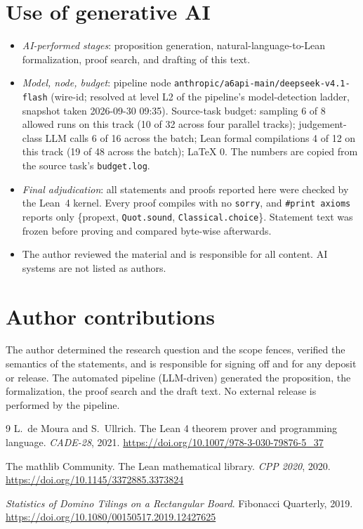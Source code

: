 \documentclass[11pt]{article}
\begin{document}
\section*{Use of generative AI}
\begin{itemize}
\item \emph{AI-performed stages}: proposition generation, natural-language-to-Lean
formalization, proof search, and drafting of this text.
\item \emph{Model, node, budget}: pipeline node
\texttt{anthropic/}\allowbreak\texttt{a6api-main/}\allowbreak\texttt{deepseek-v4.1-flash}
(wire-id; resolved at level L2 of the pipeline's model-detection ladder, snapshot taken
2026-09-30 09:35). Source-task budget: sampling 6 of 8 allowed runs on this track (10 of 32
across four parallel tracks); judgement-class LLM calls 6 of 16 across the batch; Lean
formal compilations 4 of 12 on this track (19 of 48 across the batch); LaTeX 0. The numbers
are copied from the source task's \texttt{budget.log}.
\item \emph{Final adjudication}: all statements and proofs reported here were checked by the
Lean~4 kernel. Every proof compiles with no \texttt{sorry}, and \texttt{\#print axioms}
reports only \{propext, \texttt{Quot.sound}, \texttt{Classical.choice}\}. Statement text was
frozen before proving and compared byte-wise afterwards.
\item The author reviewed the material and is responsible for all content. AI systems are
not listed as authors.
\end{itemize}

\section*{Author contributions}
The author determined the research question and the scope fences, verified the semantics of
the statements, and is responsible for signing off and for any deposit or release. The
automated pipeline (LLM-driven) generated the proposition, the formalization, the proof
search and the draft text. No external release is performed by the pipeline.

\begin{thebibliography}{9}
L.~de Moura and S.~Ullrich.
\newblock The Lean 4 theorem prover and programming language.
\newblock \emph{CADE-28}, 2021. \url{https://doi.org/10.1007/978-3-030-79876-5_37}

The mathlib Community.
\newblock The Lean mathematical library.
\newblock \emph{CPP 2020}, 2020. \url{https://doi.org/10.1145/3372885.3373824}

\emph{Statistics of Domino Tilings on a Rectangular Board}.
\newblock Fibonacci Quarterly, 2019.
\newblock \url{https://doi.org/10.1080/00150517.2019.12427625}
\end{thebibliography}
\end{document}
